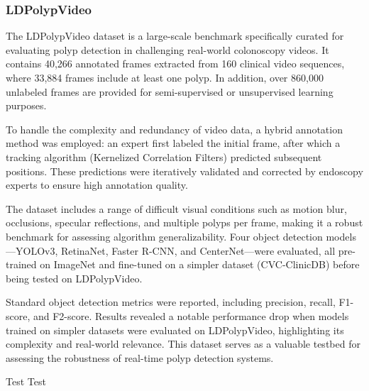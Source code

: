 \subsubsection*{LDPolypVideo}

The LDPolypVideo dataset is a large-scale benchmark specifically curated for evaluating polyp detection in challenging real-world colonoscopy videos. It contains 40,266 annotated frames extracted from 160 clinical video sequences, where 33,884 frames include at least one polyp. In addition, over 860,000 unlabeled frames are provided for semi-supervised or unsupervised learning purposes.

To handle the complexity and redundancy of video data, a hybrid annotation method was employed: an expert first labeled the initial frame, after which a tracking algorithm (Kernelized Correlation Filters) predicted subsequent positions. These predictions were iteratively validated and corrected by endoscopy experts to ensure high annotation quality.

The dataset includes a range of difficult visual conditions such as motion blur, occlusions, specular reflections, and multiple polyps per frame, making it a robust benchmark for assessing algorithm generalizability. Four object detection models—YOLOv3, RetinaNet, Faster R-CNN, and CenterNet—were evaluated, all pre-trained on ImageNet and fine-tuned on a simpler dataset (CVC-ClinicDB) before being tested on LDPolypVideo.

Standard object detection metrics were reported, including precision, recall, F1-score, and F2-score. Results revealed a notable performance drop when models trained on simpler datasets were evaluated on LDPolypVideo, highlighting its complexity and real-world relevance. This dataset serves as a valuable testbed for assessing the robustness of real-time polyp detection systems.


Test Test